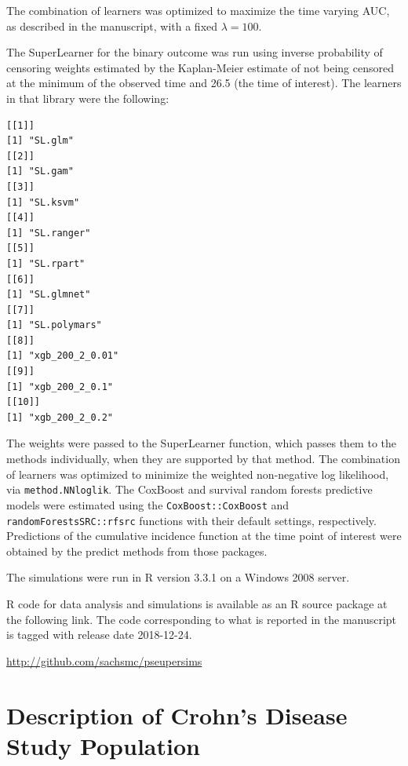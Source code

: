 \documentclass{statsoc}
\begin{document}
The combination of learners was optimized to maximize the time varying AUC, as described in the manuscript, with a fixed $\lambda = 100$. 

The SuperLearner for the binary outcome was run using inverse probability of censoring weights estimated by the Kaplan-Meier estimate of not being censored at the minimum of the observed time and 26.5 (the time of interest). The learners in that library were the following: 

\begin{verbatim}
[[1]]
[1] "SL.glm"
[[2]]
[1] "SL.gam"
[[3]]
[1] "SL.ksvm"
[[4]]
[1] "SL.ranger"
[[5]]
[1] "SL.rpart"
[[6]]
[1] "SL.glmnet"
[[7]]
[1] "SL.polymars"
[[8]]
[1] "xgb_200_2_0.01"
[[9]]
[1] "xgb_200_2_0.1"
[[10]]
[1] "xgb_200_2_0.2"
\end{verbatim}

The weights were passed to the SuperLearner function, which passes them to the methods individually, when they are supported by that method. The combination of learners was optimized to minimize the weighted non-negative log likelihood, via \texttt{method.NNloglik}. 
The CoxBoost and survival random forests predictive models were estimated using the \texttt{CoxBoost::CoxBoost} and \texttt{randomForestsSRC::rfsrc} functions with their default settings, respectively. Predictions of the cumulative incidence function at the time point of interest were obtained by the predict methods from those packages. 

The simulations were run in R version 3.3.1 on a Windows 2008 server. 

R code for data analysis and simulations is available as an R source package at the following link. The code corresponding to what is reported in the manuscript is tagged with release date 2018-12-24. 

\href{http://github.com/sachsmc/pseupersims}{http://github.com/sachsmc/pseupersims}

\section{Description of Crohn's Disease Study Population}
\end{document}
